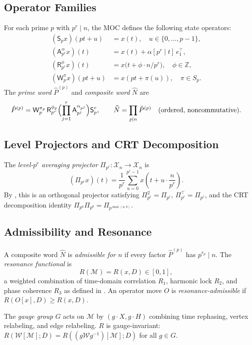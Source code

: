 \documentclass[11pt]{amsart}
\newcommand{\M}{\mathcal{M}}
\newcommand{\X}{\mathcal{X}}
\newcommand{\Prj}{\Pi}
\newcommand{\Sp}{\mathsf{S}}
\newcommand{\Ap}{\mathsf{A}}
\newcommand{\Rp}{\mathsf{R}}
\newcommand{\Wp}{\mathsf{W}}
\newcommand{\bN}{\widehat{N}}
\newcommand{\Z}{\mathbb{Z}}
\begin{document}
\subsection{Operator Families}

For each prime $p$ with $p^r \mid n$, the MOC defines the following state operators:
\begin{align*}
  (\Sp_p x)(pt + u) &= x(t), \quad u \in \{0,\ldots,p-1\}, \\
  (\Ap^\alpha_{p^r} x)(t) &= x(t) + \alpha [p^r \mid t]\, e_1^\top, \\
  (\Rp^\phi_{p^r} x)(t) &= x\bigl(t + \phi \cdot n/p^r\bigr), \quad \phi \in \Z, \\
  (\Wp^\pi_p x)(pt+u) &= x(pt + \pi(u)), \quad \pi \in S_p.
\end{align*}
The \emph{prime word} $\hat{P}^{(p)}$ and \emph{composite word} $\bN$ are
\[
  \hat{P}^{(p)} = \Wp^{\pi_p}_p\, \Rp^{\phi_p}_{p^r} \Bigl(\prod_{j=1}^r \Ap^{\alpha_{p^j}}_{p^j}\Bigr) \Sp^r_p, \qquad
  \bN = \prod_{p \mid n} \hat{P}^{(p)} \quad \text{(ordered, noncommutative)}.
\]

\subsection{Level Projectors and CRT Decomposition}

The \emph{level-$p^r$ averaging projector} $\Prj_{p^r} : \X_n \to \X_n$ is
\[
  (\Prj_{p^r} x)(t) = \frac{1}{p^r}\sum_{u=0}^{p^r-1} x\!\left(t + u \cdot \frac{n}{p^r}\right).
\]
By \cite[Appendix A]{MOC2026}, this is an orthogonal projector satisfying $\Prj_{p^r}^2 = \Prj_{p^r}$, $\Prj_{p^r}^\top = \Prj_{p^r}$, and the CRT decomposition identity $\Prj_{p^a}\Prj_{p^b} = \Prj_{p^{\max(a,b)}}$.

\subsection{Admissibility and Resonance}

A composite word $\bN$ is \emph{admissible for $n$} if every factor $\hat{P}^{(p)}$ has $p^{r_p} \mid n$. The \emph{resonance functional} is
\[
  R(\M) = R(x, D) \in [0,1],
\]
a weighted combination of time-domain correlation $R_1$, harmonic lock $R_2$, and phase coherence $R_3$ as defined in \cite[Section 3]{MOC2026}. An operator move $O$ is \emph{resonance-admissible} if $R(O[x], D) \geq R(x, D)$.

The \emph{gauge group} $G$ acts on $\M$ by $(g \cdot X, g \cdot H)$ combining time rephasing, vertex relabeling, and edge relabeling. $R$ is gauge-invariant: $R(\mathcal{W}[\M]; D) = R((g\mathcal{W}g^{-1})[\M]; D)$ for all $g \in G$.
\end{document}
